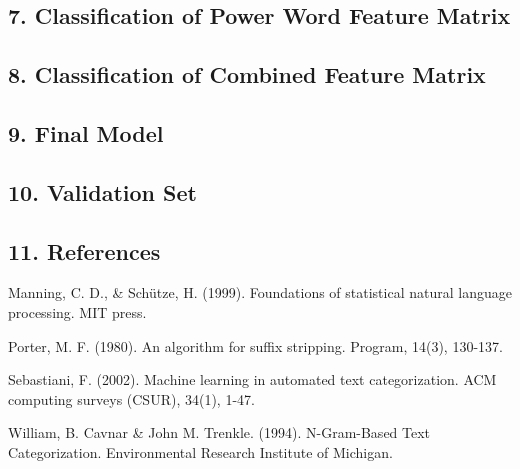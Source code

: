 \documentclass[12pt,]{article}
\begin{document}
\subsection{{7. Classification of Power Word Feature
Matrix}}\label{classification-of-power-word-feature-matrix}

\subsection{{8. Classification of Combined Feature
Matrix}}\label{classification-of-combined-feature-matrix}

\subsection{{9. Final Model}}\label{final-model}

\subsection{{10. Validation Set}}\label{validation-set}

\subsection{{11. References}}\label{references}

Manning, C. D., \& Schütze, H. (1999). Foundations of statistical
natural language processing. MIT press.

Porter, M. F. (1980). An algorithm for suffix stripping. Program, 14(3),
130-137.

Sebastiani, F. (2002). Machine learning in automated text
categorization. ACM computing surveys (CSUR), 34(1), 1-47.

William, B. Cavnar \& John M. Trenkle. (1994). N-Gram-Based Text
Categorization. Environmental Research Institute of Michigan.
\end{document}
